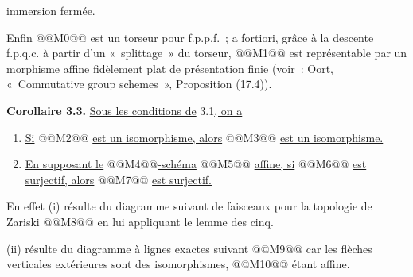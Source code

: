 
immersion fermée.

Enfin @@M0@@ est un torseur pour f.p.p.f.~; a fortiori, grâce à la descente f.p.q.c. à partir d'un «~splittage~» du torseur, @@M1@@ est représentable par un morphisme affine fidèlement plat de présentation finie (voir~: Oort, «~Commutative group schemes~», Proposition (17.4)).

\textbf{Corollaire 3.3.} \uline{Sous les conditions de} 3.1\uline{, on a}
\begin{enumerate}[label=\roman*)]
\item \uline{Si} @@M2@@ \uline{est un isomorphisme, alors} @@M3@@ \uline{est un isomorphisme.}
\item \uline{En supposant le} @@M4@@\uline{-schéma} @@M5@@ \uline{affine, si} @@M6@@ \uline{est surjectif, alors} @@M7@@ \uline{est surjectif.}
\end{enumerate}

En effet (i) résulte du diagramme suivant de faisceaux pour la topologie de Zariski
@@M8@@
en lui appliquant le lemme des cinq.

(ii) résulte du diagramme à lignes exactes suivant
@@M9@@
car les flèches verticales extérieures sont des isomorphismes, @@M10@@ étant affine.

